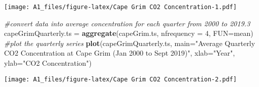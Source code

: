 \documentclass[
]{article}
\newenvironment{Shaded}{\begin{snugshade}}{\end{snugshade}}
\newcommand{\CharTok}[1]{\textcolor[rgb]{0.31,0.60,0.02}{#1}}
\newcommand{\CommentTok}[1]{\textcolor[rgb]{0.56,0.35,0.01}{\textit{#1}}}
\newcommand{\DataTypeTok}[1]{\textcolor[rgb]{0.13,0.29,0.53}{#1}}
\newcommand{\DecValTok}[1]{\textcolor[rgb]{0.00,0.00,0.81}{#1}}
\newcommand{\KeywordTok}[1]{\textcolor[rgb]{0.13,0.29,0.53}{\textbf{#1}}}
\newcommand{\NormalTok}[1]{#1}
\newcommand{\OperatorTok}[1]{\textcolor[rgb]{0.81,0.36,0.00}{\textbf{#1}}}
\newcommand{\OtherTok}[1]{\textcolor[rgb]{0.56,0.35,0.01}{#1}}
\newcommand{\StringTok}[1]{\textcolor[rgb]{0.31,0.60,0.02}{#1}}
\begin{document}
\begin{Shaded}
\end{Shaded}

\texttt{[image: A1\_files/figure-latex/Cape Grim CO2 Concentration-1.pdf]}

\begin{Shaded}
\begin{Highlighting}[]
\CommentTok{#convert data into average concentration for each quarter from 2000 to 2019.3}
\NormalTok{capeGrimQuarterly.ts =}\StringTok{ }\KeywordTok{aggregate}\NormalTok{(capeGrim.ts,  }\DataTypeTok{nfrequency =} \DecValTok{4}\NormalTok{, }\DataTypeTok{FUN=}\NormalTok{mean)}
\CommentTok{#plot the quarterly series}
\KeywordTok{plot}\NormalTok{(capeGrimQuarterly.ts, }\DataTypeTok{main=}\StringTok{"Average Quarterly CO2 Concentration at Cape Grim (Jan 2000 to Sept 2019)"}\NormalTok{, }\DataTypeTok{xlab=}\StringTok{"Year"}\NormalTok{, }\DataTypeTok{ylab=}\StringTok{"CO2 Concentration"}\NormalTok{)}
\end{Highlighting}
\end{Shaded}

\texttt{[image: A1\_files/figure-latex/Cape Grim CO2 Concentration-2.pdf]}
\end{document}
